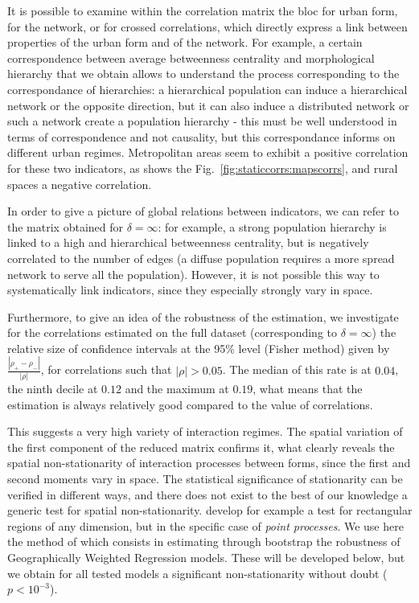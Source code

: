\documentclass[11pt]{article}
\begin{document}
It is possible to examine within the correlation matrix the bloc for urban form, for the network, or for crossed correlations, which directly express a link between properties of the urban form and of the network. For example, a certain correspondence between average betweenness centrality and morphological hierarchy that we obtain allows to understand the process corresponding to the correspondance of hierarchies: a hierarchical population can induce a hierarchical network or the opposite direction, but it can also induce a distributed network or such a network create a population hierarchy - this must be well understood in terms of correspondence and not causality, but this correspondance informs on different urban regimes. Metropolitan areas seem to exhibit a positive correlation for these two indicators, as shows the Fig.~\ref{fig:staticcorrs:mapscorrs}, and rural spaces a negative correlation.


In order to give a picture of global relations between indicators, we can refer to the matrix obtained for $\delta = \infty$: for example, a strong population hierarchy is linked to a high and hierarchical betweenness centrality, but is negatively correlated to the number of edges (a diffuse population requires a more spread network to serve all the population). However, it is not possible this way to systematically link indicators, since they especially strongly vary in space. 


Furthermore, to give an idea of the robustness of the estimation, we investigate for the correlations estimated on the full dataset (corresponding to $\delta = \infty$) the relative size of confidence intervals at the 95\% level (Fisher method) given by $\frac{\left|\rho_+ - \rho_-\right|}{\left|\rho\right|}$, for correlations such that $\left|\rho\right|>0.05$. The median of this rate is at $0.04$, the ninth decile at $0.12$ and the maximum at $0.19$, what means that the estimation is always relatively good compared to the value of correlations.

This suggests a very high variety of interaction regimes. The spatial variation of the first component of the reduced matrix confirms it, what clearly reveals the spatial non-stationarity of interaction processes between forms, since the first and second moments vary in space. The statistical significance of stationarity can be verified in different ways, and there does not exist to the best of our knowledge a generic test for spatial non-stationarity. \cite{zhang2014test} develop for example a test for rectangular regions of any dimension, but in the specific case of \emph{point processes}. We use here the method of \cite{leung2000statistical} which consists in estimating through bootstrap the robustness of Geographically Weighted Regression models. These will be developed below, but we obtain for all tested models a significant non-stationarity without doubt ($p<10^{-3}$).
\end{document}
